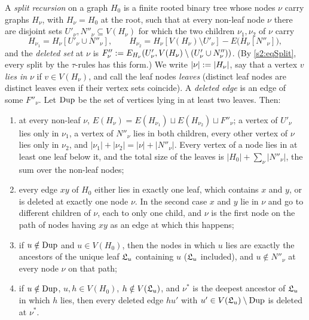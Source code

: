 \begin{lemma}\label{s2:lemSEP}
A \emph{split recursion} on a graph $H_0$ is a finite rooted binary tree whose
nodes $\nu$ carry graphs $H_\nu$, with $H_\nu=H_0$ at the root, such that at
every non-leaf node $\nu$ there are disjoint sets $U'_\nu,N''_\nu\subseteq
V(H_\nu)$ for which the two children $\nu_1,\nu_2$ of $\nu$ carry
\[
H_{\nu_1}=H_\nu[U'_\nu\cup N''_\nu],\qquad
H_{\nu_2}=H_\nu[V(H_\nu)\setminus U'_\nu]-E\bigl(H_\nu[N''_\nu]\bigr),
\]
and the \emph{deleted set} at $\nu$ is $F''_\nu\mathrel{:=}
E_{H_\nu}(U'_\nu,V(H_\nu)\setminus(U'_\nu\cup N''_\nu))$. (By
\eqref{s2:eqSplit}, every split by the $\tau$-rules has this form.) We write
$|\nu|\mathrel{:=}|H_\nu|$, say that a vertex $v$ \emph{lies in} $\nu$ if $v\in
V(H_\nu)$, and call the leaf nodes \emph{leaves} (distinct leaf nodes are
distinct leaves even if their vertex sets coincide). A \emph{deleted edge} is an
edge of some $F''_\nu$. Let $\mathrm{Dup}$ be the set of vertices lying in at least two
leaves. Then:
\begin{enumerate}
\item[(0)] at every non-leaf $\nu$, $E(H_\nu)=E(H_{\nu_1})\sqcup
E(H_{\nu_2})\sqcup F''_\nu$; a vertex of $U'_\nu$ lies only in $\nu_1$, a
vertex of $N''_\nu$ lies in both children, every other vertex of $\nu$ lies
only in $\nu_2$, and $|\nu_1|+|\nu_2|=|\nu|+|N''_\nu|$. Every vertex of a node
lies in at least one leaf below it, and the total size of the leaves is
$|H_0|+\sum_{\nu}|N''_\nu|$, the sum over the non-leaf nodes;
\item[(i)] every edge $xy$ of $H_0$ either lies in exactly one leaf, which
contains $x$ and $y$, or is deleted at exactly one node $\nu$. In the second
case $x$ and $y$ lie in $\nu$ and go to different children of $\nu$, each to
only one child, and $\nu$ is the first node on the path of nodes having $xy$
as an edge at which this happens;
\item[(ii)] if $u\notin\mathrm{Dup}$ and $u\in V(H_0)$, then the nodes in which $u$
lies are exactly the ancestors of the unique leaf $\mathfrak{L}_u$ containing $u$
($\mathfrak{L}_u$ included), and $u\notin N''_\nu$ at every node $\nu$ on that path;
\item[(iii)] if $u\notin\mathrm{Dup}$, $u,h\in V(H_0)$, $h\notin V(\mathfrak{L}_u)$, and $\nu^*$ is the
deepest ancestor of $\mathfrak{L}_u$ in which $h$ lies, then every deleted edge
$hu'$ with $u'\in V(\mathfrak{L}_u)\setminus\mathrm{Dup}$ is deleted at $\nu^*$.
\end{enumerate}
\deps{\ref{s2:defTauRules}}
\end{lemma}

